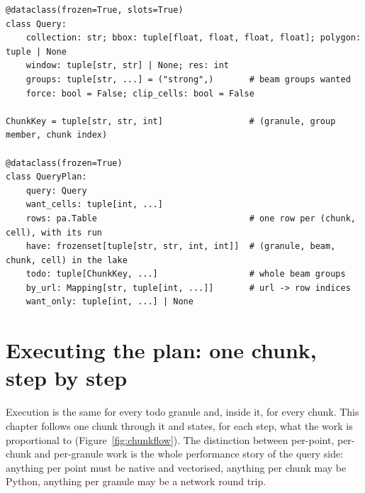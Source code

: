 \documentclass[10pt,a4paper]{article}
\begin{document}
\begin{lstlisting}
@dataclass(frozen=True, slots=True)
class Query:
    collection: str; bbox: tuple[float, float, float, float]; polygon: tuple | None
    window: tuple[str, str] | None; res: int
    groups: tuple[str, ...] = ("strong",)       # beam groups wanted
    force: bool = False; clip_cells: bool = False

ChunkKey = tuple[str, str, int]                 # (granule, group member, chunk index)

@dataclass(frozen=True)
class QueryPlan:
    query: Query
    want_cells: tuple[int, ...]
    rows: pa.Table                              # one row per (chunk, cell), with its run
    have: frozenset[tuple[str, str, int, int]]  # (granule, beam, chunk, cell) in the lake
    todo: tuple[ChunkKey, ...]                  # whole beam groups
    by_url: Mapping[str, tuple[int, ...]]       # url -> row indices
    want_only: tuple[int, ...] | None
\end{lstlisting}

\section{Executing the plan: one chunk, step by step}
\label{ch:execute}

Execution is the same for every todo granule and, inside it, for every chunk. This chapter follows one chunk
through it and states, for each step, what the work is proportional to (Figure~\ref{fig:chunkflow}). The
distinction between per-point, per-chunk and per-granule work is the whole performance story of the query side:
anything per point must be native and vectorised, anything per chunk may be Python, anything per granule may be
a network round trip.
\end{document}
